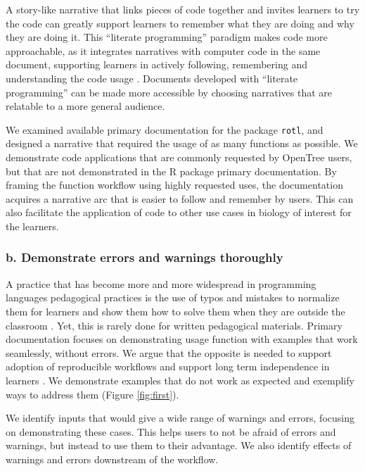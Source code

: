 \documentclass[12pt]{article}
\begin{document}
A story-like narrative that links pieces of code together and invites learners
to try the code can greatly support learners to remember what they are doing and
why they are doing it.
This ``literate programming'' paradigm \citep{knuth1984literate, fritzson2002mathmodelica}
makes code more approachable, as it integrates narratives with computer code in
the same document, supporting learners in actively following, remembering and understanding
the code usage \citep{piccolo2016tools}.
Documents developed with ``literate programming'' can be made more accessible by
choosing narratives that are relatable to a more general audience.

We examined available primary documentation for the package \texttt{rotl},
and designed a narrative that required the usage of as many functions as possible.
We demonstrate code applications that are commonly requested by OpenTree users,
but that are not demonstrated in the R package primary documentation.
By framing the function workflow using highly requested uses, the documentation acquires a
narrative arc that is easier to follow and remember by users. This can also facilitate the application
of code to other use cases in biology of interest for the learners.


\subsubsection*{b. Demonstrate errors and warnings thoroughly}

A practice that has become more and more widespread in programming languages pedagogical practices
is the use of typos and mistakes to normalize them for learners and show them how
to solve them when they are outside the classroom \citep{shannon2015live}.
Yet, this is rarely done for written pedagogical materials.
Primary documentation focuses on demonstrating usage function with examples that
work seamlessly, without errors. We argue that the opposite is needed to support
adoption of reproducible workflows and support long term independence in learners
\citep{gaspar2007restoring}.
We demonstrate examples that do not work
as expected and exemplify ways to address them (Figure \ref{fig:first}).

We identify inputs that would give
a wide range of warnings and errors, focusing on demonstrating these cases. This
helps users to not be afraid of errors and warnings, but instead to use them to
their advantage.
We also identify effects of warnings and errors downstream of the workflow.
\end{document}
